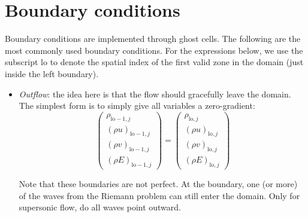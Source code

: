 \section{Boundary conditions}

Boundary conditions are implemented through ghost cells.  The following
are the most commonly used boundary conditions.  For the expressions
below, we use the subscript $\mathrm{lo}$ to denote the spatial index
of the first valid zone in the domain (just inside the left boundary).

\begin{itemize}

\item {\em Outflow}: the idea here is that the flow should gracefully
  leave the domain.  The simplest form is to simply give all variables
  a zero-gradient:
  \begin{equation}
  \left ( \begin{array}{c} \rho_{\mathrm{lo-1},j} \\
                           (\rho u)_{\mathrm{lo-1},j} \\
                           (\rho v)_{\mathrm{lo-1},j} \\
                           (\rho E)_{\mathrm{lo-1},j} \end{array} \right ) =
  \left ( \begin{array}{c} \rho_{\mathrm{lo},j} \\
                           (\rho u)_{\mathrm{lo},j} \\
                           (\rho v)_{\mathrm{lo},j} \\
                           (\rho E)_{\mathrm{lo},j} \end{array} \right )
  \end{equation}

  Note that these boundaries are not perfect.  At the boundary, one
  (or more) of the waves from the Riemann problem can still enter
  the domain.  Only for supersonic flow, do all waves point outward.



\end{itemize}
